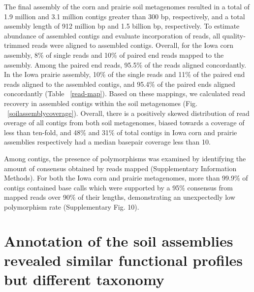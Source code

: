 \documentclass{nature}%
\begin{document}
The final assembly of the corn and prairie soil metagenomes resulted
in a total of 1.9 million and 3.1 million contigs greater than 300 bp,
respectively, and a total assembly length of 912 million bp and 1.5
billion bp, respectively.  To estimate abundance of assembled contigs
and evaluate incorporation of reads, all quality-trimmed reads were
aligned to assembled contigs.  Overall, for the Iowa corn assembly,
8\% of single reads and 10\% of paired end reads mapped to the
assembly.  Among the paired end reads, 95.5\% of the reads aligned
concordantly.  In the Iowa prairie assembly, 10\% of the single reads
and 11\% of the paired end reads aligned to the assembled contigs, and
95.4\% of the paired ends aligned concordantly (Table
~\ref{read-map}).  Based on these mappings, we calculated read
recovery in assembled contigs within the soil metagenomes
(Fig. ~\ref{soilassemblycoverage}).  Overall, there is a positively
skewed distribution of read overage of all contigs from both soil
metagenomes, biased towards a coverage of less than ten-fold, and 48\%
and 31\% of total contigs in Iowa corn and prairie assemblies
respectively had a median basepair coverage less than 10.

Among contigs, the presence of polymorphisms was examined by
identifying the amount of consensus obtained by reads mapped
(Supplementary Information Methods).  For both the Iowa corn and prairie metagenomes,
more than 99.9\% of contigs contained base calls which were supported
by a 95\% consensus from mapped reads over 90\% of their lengths,
demonstrating an unexpectedly low polymorphism rate
(Supplementary Fig. 10).
 

\section*{Annotation of the soil assemblies revealed similar functional
profiles but different taxonomy}
 
\end{document}

